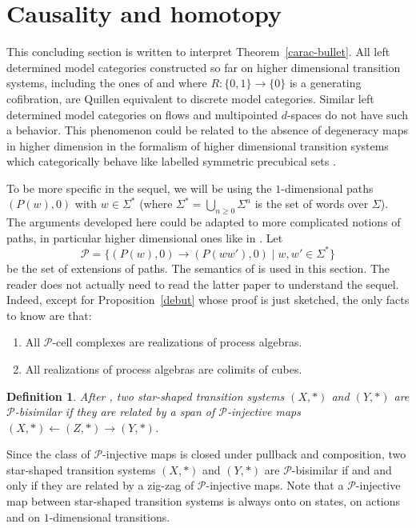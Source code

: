 \documentclass[a4paper,12pt]{amsart}
\newtheorem{defn}[thm]{Definition}
\begin{document}
\section{Causality and homotopy}
\label{futur}

This concluding section is written to interpret
Theorem~\ref{carac-bullet}.  All left determined model categories
constructed so far on higher dimensional transition systems, including
the ones of \cite{cubicalhdts} and \cite{csts} where $R:\{0,1\}\to
\{0\}$ is a generating cofibration, are Quillen equivalent to discrete
model categories. Similar left determined model categories on flows
\cite{model3} and multipointed $d$-spaces \cite{mdtop} do not have
such a behavior. This phenomenon could be related to the absence of
degeneracy maps in higher dimension in the formalism of higher
dimensional transition systems which categorically behave like
labelled symmetric precubical sets \cite[Theorem~11.6]{hdts}.

To be more specific in the sequel, we will be using the
$1$-dimensional paths $(P(w),0)$ with $w\in \Sigma^*$ (where
$\Sigma^*= \bigcup_{n{\geqslant} 0} \Sigma^n$ is the set of words over
$\Sigma$). The arguments developed here could be adapted to more
complicated notions of paths, in particular higher dimensional ones
like in \cite{zbMATH06567559}. Let \[\mathcal{P}=\{(P(w),0) \to
(P(ww'),0) \mid w,w'\in \Sigma^*\}\] be the set of extensions of paths.
The semantics of \cite{hdts} is used in this section. The reader does
not actually need to read the latter paper to understand the
sequel. Indeed, except for Proposition~\ref{debut} whose proof is just
sketched, the only facts to know are that:
\begin{enumerate}
\item All $\mathcal{P}$-cell complexes are realizations of process
  algebras.
\item All realizations of process algebras are colimits of cubes.
\end{enumerate}

\begin{defn} After \cite{0856.68067}, two star-shaped transition systems
$(X,*)$ and $(Y,*)$ are \emph{$\mathcal{P}$-bisimilar} if they are
related by a span of $\mathcal{P}$-injective maps $(X,*) \leftarrow
(Z,*) \rightarrow (Y,*)$. \end{defn}

Since the class of $\mathcal{P}$-injective maps is closed under
pullback and composition, two star-shaped transition systems $(X,*)$
and $(Y,*)$ are $\mathcal{P}$-bisimilar if and and only if they are
related by a zig-zag of $\mathcal{P}$-injective maps. Note that a
$\mathcal{P}$-injective map between star-shaped transition systems is
always onto on states, on actions and on $1$-dimensional transitions.
\end{document}
